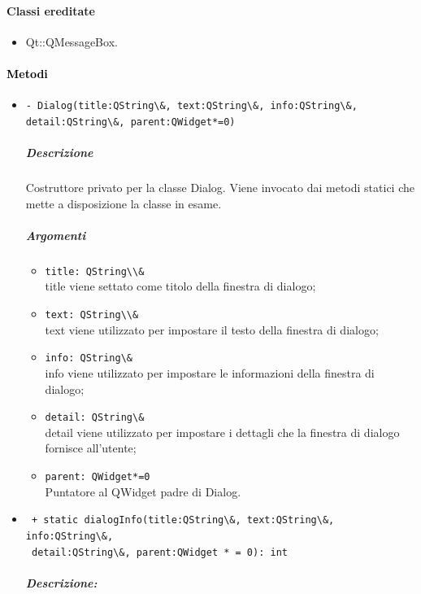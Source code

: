 \paragraph{Classi ereditate\\}
\begin{itemize}
\item Qt::QMessageBox.
\end{itemize}
\paragraph{\textcolor{black}{Metodi\\}}
\begin{itemize}
	\item \color{blue}\verb!- Dialog(title:QString\&, text:QString\&, info:QString\&, detail:QString\&, parent:QWidget*=0)!
\subparagraph*{Descrizione}
\color{black}Costruttore privato per la classe Dialog. Viene invocato dai metodi statici che mette a disposizione la classe in esame. \\
\subparagraph{Argomenti}
\begin{itemize}
\item \color{RoyalPurple} \verb!title: QString\\& !\\ title viene settato come titolo della finestra di dialogo;
\item \color{RoyalPurple} \verb!text: QString\\& !\\ text viene utilizzato per impostare il testo della finestra di dialogo;
\item \color{RoyalPurple} \verb!info: QString\& !\\ info viene utilizzato per impostare le informazioni della finestra di dialogo;
\item \color{RoyalPurple} \verb!detail: QString\& !\\ detail viene utilizzato per impostare i dettagli che la finestra di dialogo fornisce all'utente;
\item\color{RoyalPurple} \verb!parent: QWidget*=0 ! \\ Puntatore al QWidget padre di Dialog.
\end{itemize}
	\item \color{blue}\verb! + static dialogInfo(title:QString\&, text:QString\&, info:QString\&,! \\ \verb! detail:QString\&, parent:QWidget * = 0): int!
\color{black}
\subparagraph{Descrizione: }

\end{itemize}
